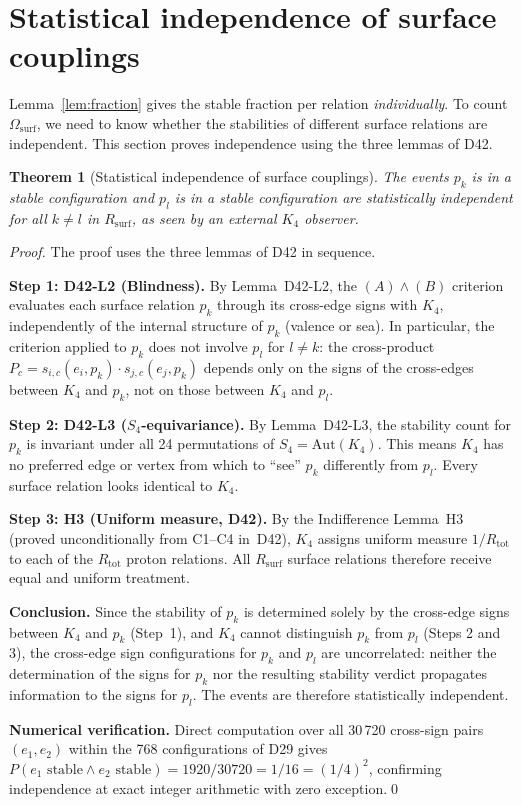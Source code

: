 \documentclass[12pt,a4paper]{article}
\newtheorem{theorem}{Theorem}[section]
\newcommand{\Kfour}{K_4}
\newcommand{\Rsurf}{R_{\mathrm{surf}}}
\newcommand{\Rtot}{R_{\mathrm{tot}}}
\newcommand{\Omegasurf}{\Omega_{\mathrm{surf}}}
\begin{document}
\section{Statistical independence of surface couplings}
\label{sec:independence}

Lemma~\ref{lem:fraction} gives the stable fraction per relation \emph{individually}. To count $\Omegasurf$, we need to know whether the stabilities of different surface relations are independent. This section proves independence using the three lemmas of D42.

\begin{theorem}[Statistical independence of surface couplings]
\label{thm:independence}
The events { $p_k$ is in a stable configuration } and { $p_l$ is in a stable configuration } are statistically independent for all $k \neq l$ in $\Rsurf$, as seen by an external $\Kfour$ observer.
\end{theorem}

\begin{proof}
The proof uses the three lemmas of D42 in sequence.

\textbf{Step 1: D42-L2 (Blindness).} By Lemma~D42-L2, the $(A)\wedge(B)$ criterion evaluates each surface relation $p_k$ through its cross-edge signs with $\Kfour$, independently of the internal structure of $p_k$ (valence or sea). In particular, the criterion applied to $p_k$ does not involve $p_l$ for $l \neq k$: the cross-product $P_c = s_{i,c}(e_i, p_k)\cdot s_{j,c}(e_j, p_k)$ depends only on the signs of the cross-edges between $\Kfour$ and $p_k$, not on those between $\Kfour$ and $p_l$.

\textbf{Step 2: D42-L3 ($S_4$-equivariance).} By Lemma~D42-L3, the stability count for $p_k$ is invariant under all 24 permutations of $S_4 = \mathrm{Aut}(\Kfour)$. This means $\Kfour$ has no preferred edge or vertex from which to ``see'' $p_k$ differently from $p_l$. Every surface relation looks identical to $\Kfour$.

\textbf{Step 3: H3 (Uniform measure, D42).} By the Indifference Lemma~H3 (proved unconditionally from C1--C4 in~D42), $\Kfour$ assigns uniform measure $1/\Rtot$ to each of the $\Rtot$ proton relations. All $\Rsurf$ surface relations therefore receive equal and uniform treatment.

\textbf{Conclusion.} Since the stability of $p_k$ is determined solely by the cross-edge signs between $\Kfour$ and $p_k$ (Step~1), and $\Kfour$ cannot distinguish $p_k$ from $p_l$ (Steps 2 and 3), the cross-edge sign configurations for $p_k$ and $p_l$ are uncorrelated: neither the determination of the signs for $p_k$ nor the resulting stability verdict propagates information to the signs for $p_l$. The events are therefore statistically independent.

\textbf{Numerical verification.} Direct computation over all 30\,720 cross-sign pairs $(e_1, e_2)$ within the 768 configurations of D29 gives $P(e_1 \text{ stable} \wedge e_2 \text{ stable}) = 1920/30720 = 1/16 = (1/4)^2$, confirming independence at exact integer arithmetic with zero exception.\qed
\end{proof}
\end{document}
